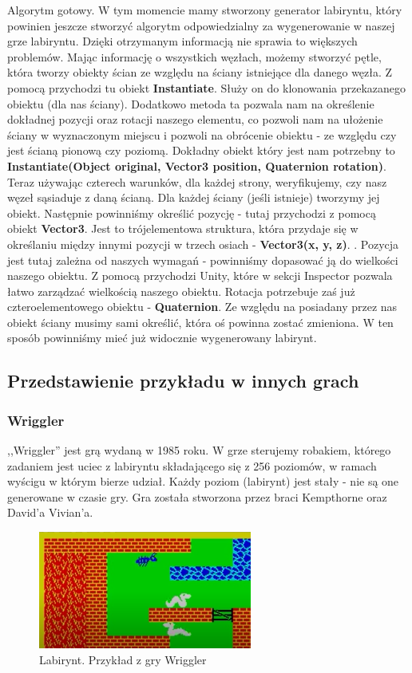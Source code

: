 \documentclass[oneside,polski,logo]{amuthesis}
\begin{document}
Algorytm gotowy. W tym momencie mamy stworzony generator labiryntu, który powinien jeszcze stworzyć algorytm odpowiedzialny za wygenerowanie w naszej grze labiryntu. Dzięki otrzymanym informacją nie sprawia to większych problemów. Mając informację o wszystkich węzłach, możemy stworzyć pętle, która tworzy obiekty ścian ze względu na ściany istniejące dla danego węzła. Z pomocą przychodzi tu obiekt \textbf{Instantiate}. Służy on do klonowania przekazanego obiektu (dla nas ściany). Dodatkowo metoda ta pozwala nam na określenie dokładnej pozycji oraz rotacji naszego elementu, co pozwoli nam na ułożenie ściany w wyznaczonym miejscu i pozwoli na obrócenie obiektu - ze względu czy jest ścianą pionową czy poziomą. Dokładny obiekt który jest nam potrzebny to \textbf{Instantiate(Object original, Vector3 position, Quaternion rotation)}. \cite{Instantiate}
Teraz używając czterech warunków, dla każdej strony, weryfikujemy, czy nasz węzeł sąsiaduje z daną ścianą. Dla każdej ściany (jeśli istnieje) tworzymy jej obiekt. Następnie powinniśmy określić pozycję - tutaj przychodzi z pomocą obiekt \textbf{Vector3}. Jest to trójelementowa struktura, która przydaje się w określaniu między innymi pozycji w trzech osiach - \textbf{Vector3(x, y, z)}. \cite{Vector3}. Pozycja jest tutaj zależna od naszych wymagań - powinniśmy dopasować ją do wielkości naszego obiektu. Z pomocą przychodzi Unity, które w sekcji Inspector pozwala łatwo zarządzać wielkością naszego obiektu. Rotacja potrzebuje zaś już czteroelementowego obiektu - \textbf{Quaternion}. Ze względu na posiadany przez nas obiekt ściany musimy sami określić, która oś powinna zostać zmieniona. W ten sposób powinniśmy mieć już widocznie wygenerowany labirynt.


\subsection{Przedstawienie przykładu w innych grach}
\subsubsection{Wriggler}
\par ,,Wriggler'' jest grą wydaną w 1985 roku. W grze sterujemy robakiem, którego zadaniem jest uciec z labiryntu składającego się z 256 poziomów, w ramach wyścigu w którym bierze udział. Każdy poziom (labirynt) jest stały - nie są one generowane w czasie gry. Gra została stworzona przez braci Kempthorne oraz David'a Vivian'a. \cite{Wriggler}

\begin{figure}[h!]
	\centering
	\includegraphics[width=7cm]{images/tyrek/wriggler.png}
	\caption{Labirynt. Przykład z gry Wriggler}
\end{figure}
\end{document}
